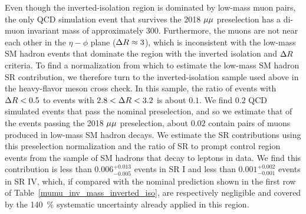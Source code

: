 Even though the inverted-isolation region is dominated by low-mass muon pairs, the only QCD simulation event that survives the 2018 ${\mu}{\mu}$ preselection has a di-muon invariant mass of approximately 300\GeV. Furthermore, the muons are not near each other in the $\eta-\phi$ plane ($\Delta R\approx3$), which is inconsistent with the low-mass SM hadron events that dominate the region with the inverted isolation and $\Delta R$ criteria. To find a normalization from which to estimate the low-mass SM hadron SR contribution, we therefore turn to the inverted-isolation sample used above in the heavy-flavor meson cross check. In this sample, the ratio of events with $\Delta R<0.5$ to events with $2.8<\Delta R<3.2$ is about $0.1$. We find $0.2$ QCD simulated events that pass the nominal preselection, and so we estimate that of the events passing the 2018 ${\mu}{\mu}$ preselection, about $0.02$ contain pairs of muons produced in low-mass SM hadron decays. We estimate the SR contributions using this preselection normalization and the ratio of SR to prompt control region events from the sample of SM hadrons that decay to leptons in data. We find this contribution is less than $0.006^{+0.013}_{-0.005}$ events in SR I and less than $0.001^{+0.002}_{-0.001}$ events in SR IV, which, if compared with the nominal prediction shown in the first row of Table~\ref{mumu_inv_mass_inverted_iso}, are respectively negligible and covered by the \SI{140}{\percent} systematic uncertainty already applied in this region.


\pagebreak